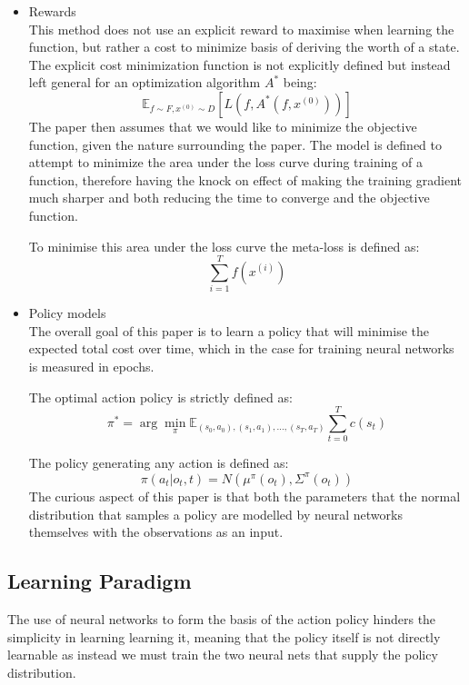 \documentclass[sigconf]{acmart}
\begin{document}
\begin{itemize}
  \item Rewards\\
  This method does not use an explicit reward to maximise when learning the function, but rather a cost to minimize basis of deriving the worth of a state.
  The explicit cost minimization function is not explicitly defined but instead left general for an optimization algorithm $A^*$ being:
  \begin{equation}
    \mathbb{E}_{f\sim F,x^{(0)}\sim D}[L(f,A^*(f,x^{(0)}))]
  \end{equation}
  The paper then assumes that we would like to minimize the objective function, given the nature surrounding the paper.
  The model is defined to attempt to minimize the area under the loss curve during training of a function, therefore having the knock on effect of making the 
  training gradient much sharper and both reducing the time to converge and the objective function.

  To minimise this area under the loss curve the meta-loss is defined as:
  \begin{equation}
    \sum_{i=1}^Tf(x^{(i)})
  \end{equation}
  \item Policy models\\
  The overall goal of this paper is to learn a policy that will minimise the expected total cost over time, which in the case for training neural networks is measured in epochs.

  The optimal action policy is strictly defined as:
  \begin{equation}
    \pi^* = \arg\min_\pi \mathbb{E}_{(s_0,a_0),(s_1,a_1),...,(s_T,a_T)}\sum_{t=0}^{T}c(s_t)
  \end{equation}

  The policy generating any action is defined as:
  \begin{equation}
    \pi(a_t|o_t, t) = \mathit{N}(\mu^\pi(o_t),\Sigma^\pi(o_t))
  \end{equation}
  The curious aspect of this paper is that both the parameters that the normal distribution that samples a policy are modelled by neural networks themselves with the observations as an input.

\end{itemize}
\subsection{Learning Paradigm}
  The use of neural networks to form the basis of the action policy hinders the simplicity in learning learning it, meaning that the policy itself is not directly learnable as instead we must train the two neural nets that supply the policy distribution.
  
\end{document}
